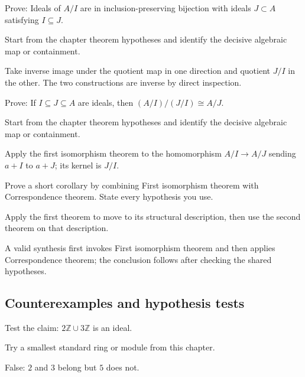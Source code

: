 \begin{exercise}\label{exr:v01-expand-07}
Prove: Ideals of $A/I$ are in inclusion-preserving bijection with ideals $J\subset A$ satisfying $I\subseteq J$.
\end{exercise}
\begin{hint}
Start from the chapter theorem hypotheses and identify the decisive algebraic map or containment.
\end{hint}
\begin{solution}
Take inverse image under the quotient map in one direction and quotient $J/I$ in the other. The two constructions are inverse by direct inspection.
\end{solution}

\begin{exercise}\label{exr:v01-expand-08}
Prove: If $I\subseteq J\subseteq A$ are ideals, then $(A/I)/(J/I)\cong A/J$.
\end{exercise}
\begin{hint}
Start from the chapter theorem hypotheses and identify the decisive algebraic map or containment.
\end{hint}
\begin{solution}
Apply the first isomorphism theorem to the homomorphism $A/I\to A/J$ sending $a+I$ to $a+J$; its kernel is $J/I$.
\end{solution}

\begin{exercise}\label{exr:v01-expand-09}
Prove a short corollary by combining First isomorphism theorem with Correspondence theorem. State every hypothesis you use.
\end{exercise}
\begin{hint}
Apply the first theorem to move to its structural description, then use the second theorem on that description.
\end{hint}
\begin{solution}
A valid synthesis first invokes First isomorphism theorem and then applies Correspondence theorem; the conclusion follows after checking the shared hypotheses.
\end{solution}

\subsection*{Counterexamples and hypothesis tests}

\begin{exercise}\label{exr:v01-expand-10}
Test the claim: $2\mathbb Z\cup3\mathbb Z$ is an ideal.
\end{exercise}
\begin{hint}
Try a smallest standard ring or module from this chapter.
\end{hint}
\begin{solution}
False: $2$ and $3$ belong but $5$ does not.
\end{solution}

